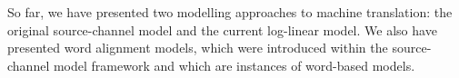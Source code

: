 


So far, we have presented two modelling approaches to machine translation:
the original source-channel model and the current log-linear model. We also
have presented word alignment models, which were introduced within the source-channel
model framework and which are instances of word-based models.

